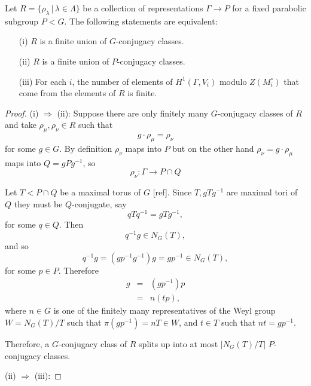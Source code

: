 \begin{lemma}\label{kToHOne} Let $R=\{\rho_\lambda\, |\, \lambda \in \Lambda\}$ be a collection of representations $\Gamma\rightarrow P$ for a fixed parabolic subgroup $P<G$. The following statements are equivalent:
	\begin{itemize}
		\item[(i)] $R$ is a finite union of $G$-conjugacy classes.
		\item[(ii)] $R$ is a finite union of $P$-conjugacy classes.
		\item[(iii)] For each $i$, the number of elements of $H^1(\Gamma, V_i)$ modulo $Z(M_i^\circ)$ that come from the elements of $R$ is finite.
	\end{itemize}
\end{lemma}
\begin{proof}
	(i) $\Rightarrow$ (ii):
	Suppose there are only finitely many $G$-conjugacy classes of $R$ and take $\rho_\mu, \rho_\nu \in R$ such that
	\begin{displaymath}
		g\cdot \rho_\mu = \rho_\nu
	\end{displaymath}
	for some $g \in G$. By definition $\rho_\nu$ maps into $P$ but on the other hand $\rho_\nu = g\cdot \rho_\mu$ maps into $Q = gPg^{-1}$, so 
	\begin{displaymath}
		\rho_\nu: \Gamma\rightarrow P \cap Q
	\end{displaymath}
	
	Let $T < P \cap Q$ be a maximal torus of $G$ [ref]. Since $T,gTg^{-1}$ are maximal tori of $Q$ they must be $Q$-conjugate, say
	\begin{displaymath}
		qTq^{-1} = gTg^{-1},
	\end{displaymath}
	for some $q \in Q$. Then 
	\begin{displaymath}
		q^{-1}g \in N_G(T),
	\end{displaymath}
	and so
	\begin{displaymath}
		q^{-1}g = (gp^{-1}g^{-1})g = gp^{-1} \in N_G(T),
	\end{displaymath}
	for some $p \in P$. Therefore
	\begin{eqnarray*}
		g &=& (gp^{-1})p\\
		&=& n(tp),
	\end{eqnarray*}
	where $n\in G$ is one of the finitely many representatives of the Weyl group $W=N_G(T)/T$ such that $\pi(gp^{-1}) = nT\in W$, and $t\in T$ such that $nt = gp^{-1}$.
	
	Therefore, a $G$-conjugacy class of $R$ splits up into at most $|N_G(T)/T|$ $P$-conjugacy classes.
	
	
	(ii) $\Rightarrow$ (iii):
\end{proof}


